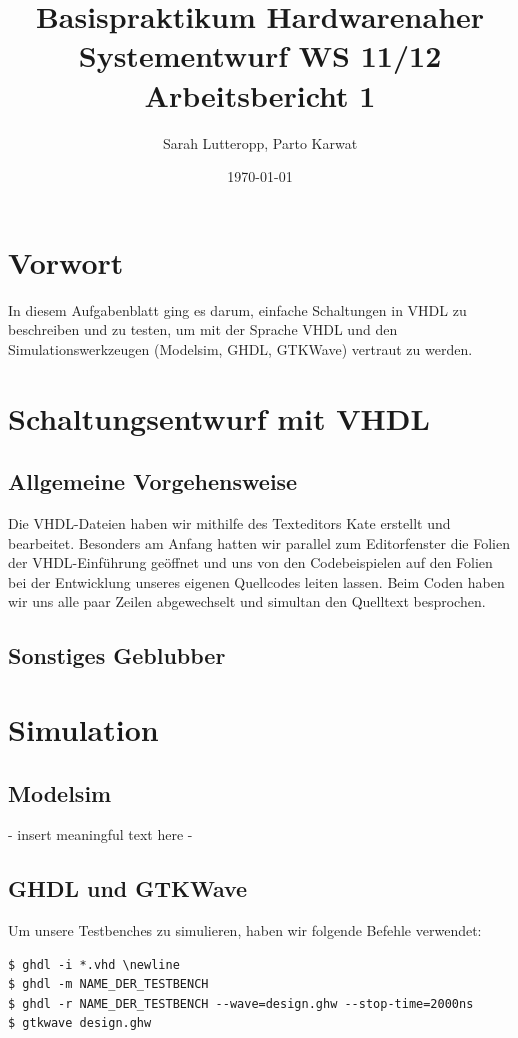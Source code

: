 \documentclass[a4paper, 11pt]{article}
\author{Sarah Lutteropp, Parto Karwat}
\title{Basispraktikum Hardwarenaher Systementwurf WS 11/12 \\ Arbeitsbericht 1}
\date{\today}
\theoremstyle{definition}
\theoremstyle{plain}
\begin{document}
\maketitle

\section{Vorwort}
In diesem Aufgabenblatt ging es darum, einfache Schaltungen in VHDL zu beschreiben und zu testen, um mit der Sprache VHDL und den Simulationswerkzeugen (Modelsim, GHDL, GTKWave) vertraut zu werden.

\section{Schaltungsentwurf mit VHDL}

\subsection{Allgemeine Vorgehensweise}
Die VHDL-Dateien haben wir mithilfe des Texteditors Kate erstellt und bearbeitet. Besonders am Anfang hatten wir parallel zum Editorfenster die Folien der VHDL-Einführung geöffnet und uns von den Codebeispielen auf den Folien bei der Entwicklung unseres eigenen Quellcodes leiten lassen. Beim Coden haben wir uns alle paar Zeilen abgewechselt und simultan den Quelltext besprochen.

\subsection{Sonstiges Geblubber}

\section{Simulation}

\subsection{Modelsim}
- insert meaningful text here -

\subsection{GHDL und GTKWave}
Um unsere Testbenches zu simulieren, haben wir folgende Befehle verwendet:
\begin{lstlisting}
$ ghdl -i *.vhd \newline
$ ghdl -m NAME_DER_TESTBENCH
$ ghdl -r NAME_DER_TESTBENCH --wave=design.ghw --stop-time=2000ns
$ gtkwave design.ghw
\end{lstlisting}
\end{document}
